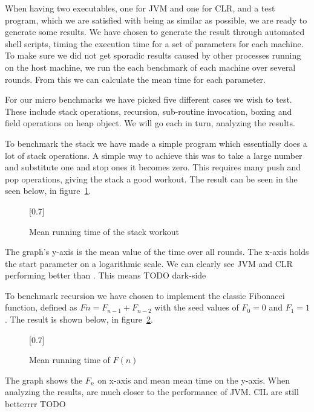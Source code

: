 When having two executables, one for JVM and one for CLR, and a \thename{} test
program, which we are satisfied with being as similar as possible, we are ready
to generate some results. We have chosen to generate the result through
automated shell scripts, timing the execution time for a set of parameters for
each machine. To make sure we did not get sporadic results caused by other
processes running on the host machine, we run the each benchmark of each machine
over several rounds. From this we can calculate the mean time for each
parameter.

For our micro benchmarks we have picked five different cases we wish to
test. These include stack operations, recursion, sub-routine invocation, boxing
and field operations on heap object. We will go each in turn, analyzing the
results.


To benchmark the stack we have made a simple program which essentially does a
lot of stack operations. A simple way to achieve this was to take a large number
and substitute one and stop ones it becomes zero. This requires many push and
pop operations, giving the stack a good workout. The result can be seen in the
seen below, in figure~\ref{fig:eval:benchmark:stack}.
\begin{figure}[H]
  \centering
  \scalebox{0.8}[0.7]{}
  \caption{Mean running time of the stack workout}
\label{fig:eval:benchmark:stack}
\end{figure}

The graph's y-axis is the mean value of the time over all rounds. The x-axis
holds the start parameter on a logarithmic scale. We can clearly see JVM and CLR
performing better than \thename{}. This means TODO dark-side


To benchmark recursion we have chosen to implement the classic Fibonacci
function, defined as $Fn = F_{n-1} + F_{n-2}$ with the seed values of $F_0 = 0$
and $F_1 = 1$. The result is shown below, in figure~\ref{fig:eval:benchmark:fib}.
\begin{figure}[H]
  \centering
  \scalebox{0.8}[0.7]{}
  \caption{Mean running time of $F(n)$}
\label{fig:eval:benchmark:fib}
\end{figure}

The graph shows the $F_n$ on x-axis and mean mean time on the y-axis. When
analyzing the results, \thename{} are much closer to the performance of JVM. CIL
are still betterrrr TODO

